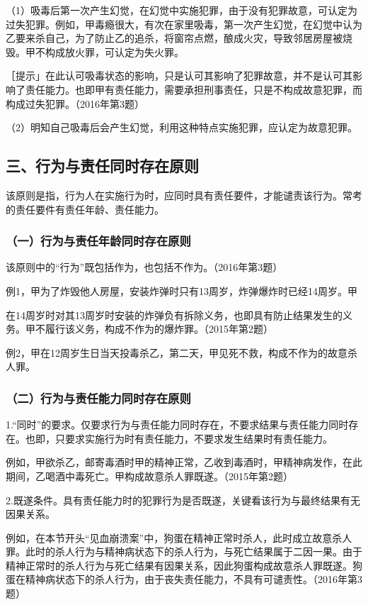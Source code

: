 （1）吸毒后第一次产生幻觉，在幻觉中实施犯罪，由于没有犯罪故意，可认定为过失犯罪。例如，甲毒瘾很大，有次在家里吸毒，第一次产生幻觉，在幻觉中认为乙要来杀自己，为了防止乙的追杀，将窗帘点燃，酿成火灾，导致邻居房屋被烧毁。甲不构成放火罪，可认定为失火罪。

［提示」在此认可吸毒状态的影响，只是认可其影响了犯罪故意，并不是认可其影响了责任能力。也即甲有责任能力，需要承担刑事责任，只是不构成故意犯罪，而构成过失犯罪。（2016年第3题）

（2）明知自己吸毒后会产生幻觉，利用这种特点实施犯罪，应认定为故意犯罪。

\subsection*{三、行为与责任同时存在原则}

该原则是指，行为人在实施行为时，应同时具有责任要件，才能谴责该行为。常考的责任要件有责任年龄、责任能力。

\subsubsection*{（一）行为与责任年龄同时存在原则}

该原则中的“行为”既包括作为，也包括不作为。（2016年第3题）

例1，甲为了炸毁他人房屋，安装炸弹时只有13周岁，炸弹爆炸时已经14周岁。甲

在14周岁时对其13周岁时安装的炸弹负有拆除义务，也即具有防止结果发生的义务。甲不履行该义务，构成不作为的爆炸罪。（2015年第2题）

例2，甲在12周岁生日当天投毒杀乙，第二天，甲见死不救，构成不作为的故意杀人罪。

\subsubsection*{（二）行为与责任能力同时存在原则}

1.“同时”的要求。仅要求行为与责任能力同时存在，不要求结果与责任能力同时存在。也即，只要求实施行为时有责任能力，不要求发生结果时有责任能力。

例如，甲欲杀乙，邮寄毒酒时甲的精神正常，乙收到毒酒时，甲精神病发作，在此期间，乙喝酒中毒死亡。甲构成故意杀人罪既遂。（2015年第2题）

2.既遂条件。具有责任能力时的犯罪行为是否既遂，关键看该行为与最终结果有无因果关系。

例如，在本节开头“见血崩溃案”中，狗蛋在精神正常时杀人，此时成立故意杀人罪。此时的杀人行为与精神病状态下的杀人行为，与死亡结果属于二因一果。由于精神正常时的杀人行为与死亡结果有因果关系，因此狗蛋构成故意杀人罪既遂。狗蛋在精神病状态下的杀人行为，由于丧失责任能力，不具有可谴责性。（2016年第3题）

